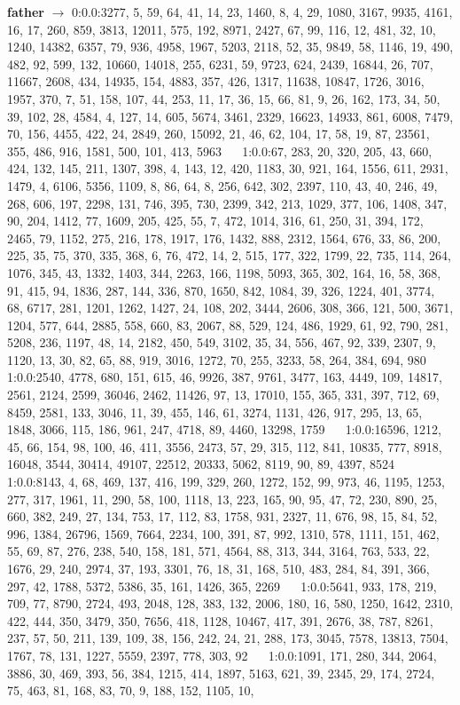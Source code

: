 \documentclass[a4paper,11pt,oneside]{book}
\begin{document}
\textbf{father} $\rightarrow$	0:0.0:3277, 5, 59, 64, 41, 14, 23, 1460, 8, 4, 29, 1080, 3167, 9935, 4161, 16, 17, 260, 859, 3813, 12011, 575, 192, 8971, 2427, 67, 99, 116, 12, 481, 32, 10, 1240, 14382, 6357, 79, 936, 4958, 1967, 5203, 2118, 52, 35, 9849, 58, 1146, 19, 490, 482, 92, 599, 132, 10660, 14018, 255, 6231, 59, 9723, 624, 2439, 16844, 26, 707, 11667, 2608, 434, 14935, 154, 4883, 357, 426, 1317, 11638, 10847, 1726, 3016, 1957, 370, 7, 51, 158, 107, 44, 253, 11, 17, 36, 15, 66, 81, 9, 26, 162, 173, 34, 50, 39, 102, 28, 4584, 4, 127, 14, 605, 5674, 3461, 2329, 16623, 14933, 861, 6008, 7479, 70, 156, 4455, 422, 24, 2849, 260, 15092, 21, 46, 62, 104, 17, 58, 19, 87, 23561, 355, 486, 916, 1581, 500, 101, 413, 5963	$\quad$	1:0.0:67, 283, 20, 320, 205, 43, 660, 424, 132, 145, 211, 1307, 398, 4, 143, 12, 420, 1183, 30, 921, 164, 1556, 611, 2931, 1479, 4, 6106, 5356, 1109, 8, 86, 64, 8, 256, 642, 302, 2397, 110, 43, 40, 246, 49, 268, 606, 197, 2298, 131, 746, 395, 730, 2399, 342, 213, 1029, 377, 106, 1408, 347, 90, 204, 1412, 77, 1609, 205, 425, 55, 7, 472, 1014, 316, 61, 250, 31, 394, 172, 2465, 79, 1152, 275, 216, 178, 1917, 176, 1432, 888, 2312, 1564, 676, 33, 86, 200, 225, 35, 75, 370, 335, 368, 6, 76, 472, 14, 2, 515, 177, 322, 1799, 22, 735, 114, 264, 1076, 345, 43, 1332, 1403, 344, 2263, 166, 1198, 5093, 365, 302, 164, 16, 58, 368, 91, 415, 94, 1836, 287, 144, 336, 870, 1650, 842, 1084, 39, 326, 1224, 401, 3774, 68, 6717, 281, 1201, 1262, 1427, 24, 108, 202, 3444, 2606, 308, 366, 121, 500, 3671, 1204, 577, 644, 2885, 558, 660, 83, 2067, 88, 529, 124, 486, 1929, 61, 92, 790, 281, 5208, 236, 1197, 48, 14, 2182, 450, 549, 3102, 35, 34, 556, 467, 92, 339, 2307, 9, 1120, 13, 30, 82, 65, 88, 919, 3016, 1272, 70, 255, 3233, 58, 264, 384, 694, 980	$\quad$	1:0.0:2540, 4778, 680, 151, 615, 46, 9926, 387, 9761, 3477, 163, 4449, 109, 14817, 2561, 2124, 2599, 36046, 2462, 11426, 97, 13, 17010, 155, 365, 331, 397, 712, 69, 8459, 2581, 133, 3046, 11, 39, 455, 146, 61, 3274, 1131, 426, 917, 295, 13, 65, 1848, 3066, 115, 186, 961, 247, 4718, 89, 4460, 13298, 1759	$\quad$	1:0.0:16596, 1212, 45, 66, 154, 98, 100, 46, 411, 3556, 2473, 57, 29, 315, 112, 841, 10835, 777, 8918, 16048, 3544, 30414, 49107, 22512, 20333, 5062, 8119, 90, 89, 4397, 8524	$\quad$	1:0.0:8143, 4, 68, 469, 137, 416, 199, 329, 260, 1272, 152, 99, 973, 46, 1195, 1253, 277, 317, 1961, 11, 290, 58, 100, 1118, 13, 223, 165, 90, 95, 47, 72, 230, 890, 25, 660, 382, 249, 27, 134, 753, 17, 112, 83, 1758, 931, 2327, 11, 676, 98, 15, 84, 52, 996, 1384, 26796, 1569, 7664, 2234, 100, 391, 87, 992, 1310, 578, 1111, 151, 462, 55, 69, 87, 276, 238, 540, 158, 181, 571, 4564, 88, 313, 344, 3164, 763, 533, 22, 1676, 29, 240, 2974, 37, 193, 3301, 76, 18, 31, 168, 510, 483, 284, 84, 391, 366, 297, 42, 1788, 5372, 5386, 35, 161, 1426, 365, 2269	$\quad$	1:0.0:5641, 933, 178, 219, 709, 77, 8790, 2724, 493, 2048, 128, 383, 132, 2006, 180, 16, 580, 1250, 1642, 2310, 422, 444, 350, 3479, 350, 7656, 418, 1128, 10467, 417, 391, 2676, 38, 787, 8261, 237, 57, 50, 211, 139, 109, 38, 156, 242, 24, 21, 288, 173, 3045, 7578, 13813, 7504, 1767, 78, 131, 1227, 5559, 2397, 778, 303, 92	$\quad$	1:0.0:1091, 171, 280, 344, 2064, 3886, 30, 469, 393, 56, 384, 1215, 414, 1897, 5163, 621, 39, 2345, 29, 174, 2724, 75, 463, 81, 168, 83, 70, 9, 188, 152, 1105, 10, 
\end{document}
